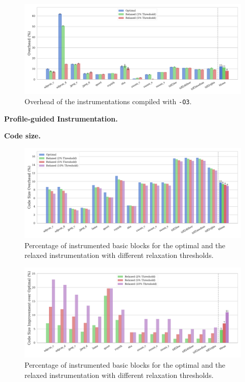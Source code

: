 \begin{figure}[ht]
    \centering
    \includegraphics[width=\textwidth]{figs/overhead-O3.pdf}
    \caption{Overhead of the instrumentations compiled with {\texttt{-O3}}.}
    \label{fig:overhead-O3}
\end{figure}

\textbf{Profile-guided Instrumentation.}

\textbf{Code size.}
\begin{figure}[ht]
    \centering
    \includegraphics[width=\textwidth]{figs/code-size-probes.pdf}
    \caption{Percentage of instrumented basic blocks for the optimal and the relaxed instrumentation with different relaxation thresholds.}
    \label{fig:num-probes}
\end{figure}

\begin{figure}[ht]
    \centering
    \includegraphics[width=\textwidth]{figs/code-size-probes-improvement.pdf}
    \caption{Percentage of instrumented basic blocks for the optimal and the relaxed instrumentation with different relaxation thresholds.}
    \label{fig:num-probes-improvement}
\end{figure}


